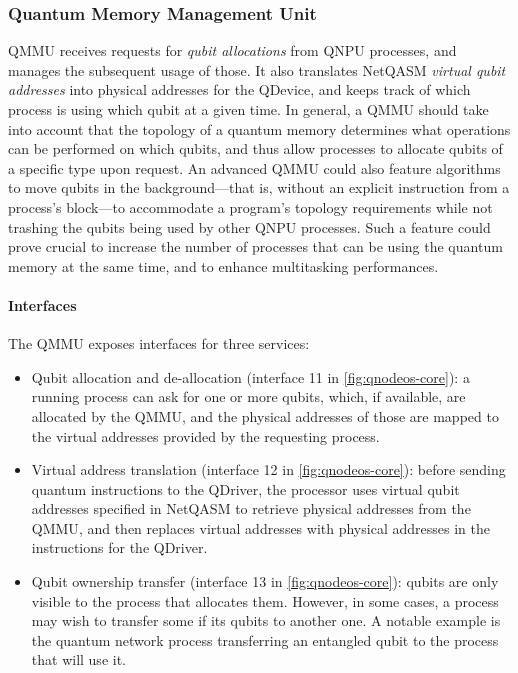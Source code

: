 \subsubsection{Quantum Memory Management Unit}

\acf{QMMU} receives requests for \emph{qubit allocations} from \ac{QNPU} processes, and manages the subsequent usage of those. It also translates \ac{NetQASM} \emph{virtual qubit addresses} into physical addresses for the \ac{QDevice}, and keeps track of which process is using which qubit at a given time. In general, a \ac{QMMU} should take into account that the topology of a quantum memory determines what operations can be performed on which qubits, and thus allow processes to allocate qubits of a specific type upon request. An advanced \ac{QMMU} could also feature algorithms to move qubits in the background---that is, without an explicit instruction from a process's block---to accommodate a program's topology requirements while not trashing the qubits being used by other \ac{QNPU} processes. Such a feature could prove crucial to increase the number of processes that can be using the quantum memory at the same time, and to enhance multitasking performances.

\paragraph{Interfaces}

The \ac{QMMU} exposes interfaces for three services:
%
\begin{itemize}
\item Qubit allocation and de-allocation (interface 11 in \cref{fig:qnodeos-core}): a running process can ask for one or more qubits, which, if available, are allocated by the \ac{QMMU}, and the physical addresses of those are mapped to the virtual addresses provided by the requesting process.
\item Virtual address translation (interface 12 in \cref{fig:qnodeos-core}): before sending quantum instructions to the \ac{QDriver}, the processor uses virtual qubit addresses specified in \ac{NetQASM} to retrieve physical addresses from the \ac{QMMU}, and then replaces virtual addresses with physical addresses in the instructions for the \ac{QDriver}.
\item Qubit ownership transfer (interface 13 in \cref{fig:qnodeos-core}): qubits are only visible to the process that allocates them. However, in some cases, a process may wish to transfer some if its qubits to another one. A notable example is the quantum network process transferring an entangled qubit to the process that will use it.
\end{itemize}

